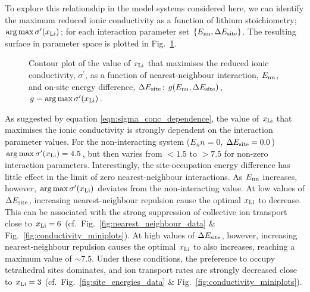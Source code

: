 \documentclass[aps,prb,twocolumn,superscriptaddress,reprint]{revtex4-1}
\newcommand{\set}[1]{\left\{#1\right\}}
\newcommand{\xLi}{x_\m{Li}}
\begin{document}
To explore this relationship in the model systems considered here, we can identify the maximum reduced ionic conductivity as a function of lithium stoichiometry; $\arg\max \sigma^\prime(\xLi)$; for each interaction parameter set $\set{E_\m{nn}, \Delta E_\m{site}}$. The resulting surface in parameter space is plotted in Fig.\ \ref{fig:max_sigma}.
\begin{figure}[tb]
  \centering
    \caption{\label{fig:max_sigma}Contour plot of the value of $\xLi$ that maximises the reduced ionic conductivity, $\sigma^\prime$, as a function of nearest-neighbour interaction, $E_{\mathrm{nn}}$, and on-site energy difference, $\Delta E_{\mathrm{site}}$: $g(E_{\mathrm{nn}}, \Delta E_{\mathrm{site}})$, $g = \arg \max \sigma^\prime(\xLi)$.}
\end{figure}
As suggested by equation \ref{eqn:sigma_conc_dependence}, the value of $\xLi$ that maximises the ionic conductivity is strongly dependent on the interaction parameter values. For the non-interacting system ($E_nn=0$, $\Delta E_{\mathrm{site}}=0.0$)$\arg \max \sigma^\prime(\xLi)=4.5$, but then varies from $<1.5$ to $>7.5$ for non-zero interaction parameters. Interestingly, the site-occupation energy difference has little effect in the limit of zero nearest-neighbour interactions. As $E_{\mathrm{nn}}$ increases, however, $\arg \max \sigma^\prime(\xLi)$ deviates from the non-interacting value. At low values of $\Delta E_{\mathrm{site}}$, increasing nearest-neighbour repulsion cause the optimal $\xLi$ to decrease. This can be associated with the strong suppression of collective ion transport close to $\xLi=6$ (cf.\ Fig.~\ref{fig:nearest_neighbour_data} \& Fig.~\ref{fig:conductivity_miniplots}). At high values of $\Delta E_{\mathrm{site}}$, however, increasing nearest-neighbour repulsion causes the optimal $\xLi$ to also increases, reaching a maximum value of $\sim7.5$. Under these conditions, the preference to occupy tetrahedral sites dominates, and ion transport rates are strongly decreased close to $\xLi=3$ (cf.\ Fig.~\ref{fig:site_energies_data} \& Fig.~\ref{fig:conductivity_miniplots}).
\end{document}
